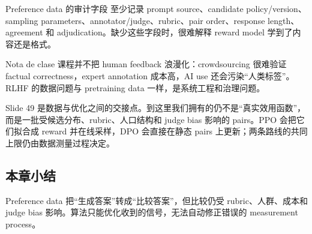\begin{importantbox}{Preference data 的审计字段}
至少记录 prompt source、candidate policy/version、sampling parameters、annotator/judge、rubric、pair order、response length、agreement 和 adjudication。缺少这些字段时，很难解释 reward model 学到了内容还是格式。
\end{importantbox}

\begin{knowledgebox}{Nota de clase}
课程并不把 human feedback 浪漫化：crowdsourcing 很难验证 factual correctness，expert annotation 成本高，AI use 还会污染“人类标签”。RLHF 的数据问题与 pretraining data 一样，是系统工程和治理问题。
\end{knowledgebox}


Slide 49 是数据与优化之间的交接点。到这里我们拥有的仍不是“真实效用函数”，而是一批受候选分布、rubric、人口结构和 judge bias 影响的 pairs。PPO 会把它们拟合成 reward 并在线采样，DPO 会直接在静态 pairs 上更新；两条路线的共同上限仍由数据测量过程决定。

\subsection{本章小结}

Preference data 把“生成答案”转成“比较答案”，但比较仍受 rubric、人群、成本和 judge bias 影响。算法只能优化收到的信号，无法自动修正错误的 measurement process。

